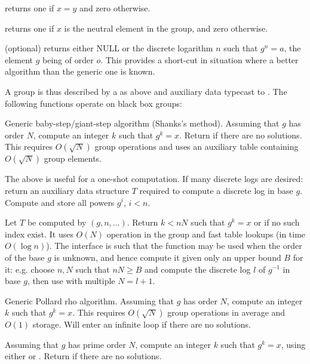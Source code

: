  returns one if $x=y$ and zero otherwise.

 returns one if $x$ is the neutral element in the group,
and zero otherwise.

 (optional) returns either NULL or the discrete logarithm
$n$ such that $g^n=a$, the element $g$ being of order $o$. This provides a
short-cut in situation where a better algorithm than the generic one is known.

A group is thus described by a  as above and auxiliary
data typecast to . The following functions operate on black box
groups:

 \break
Generic baby-step/giant-step algorithm (Shanks's method). Assuming
that $g$ has order $N$, compute an integer $k$ such that $g^k = x$.
Return  if there are no solutions. This requires
$O(\sqrt{N})$ group operations and uses an auxiliary table containing
$O(\sqrt{N})$ group elements.

The above is useful for a one-shot computation. If many discrete logs
are desired:
return an auxiliary data structure $T$ required to compute a discrete log in
base $g$. Compute and store all powers $g^i$,  $i < n$.

Let $T$ be computed by $(g,n,\dots)$.
Return $k < n N$ such that  $g^k = x$ or  if no such index exist.
It uses $O(N)$ operation in the group and fast table lookups  (in time
$O(\log n)$). The interface is such that the function may be used when the
order of the base $g$ is unknown, and hence compute it given only an upper
bound $B$ for it: e.g. choose $n,N$ such that $nN \geq B$ and compute the
discrete log $l$ of $g^{-1}$ in base $g$, then use 
with multiple $N = l+1$.

 \break
Generic Pollard rho algorithm. Assuming that $g$ has order $N$, compute an
integer $k$ such that $g^k = x$. This requires $O(\sqrt{N})$ group operations
in average and $O(1)$ storage. Will enter an infinite loop if there are no
solutions.

Assuming that $g$ has prime order $N$, compute an integer $k$ such that
$g^k = x$, using either  or .
Return  if there are no solutions.

